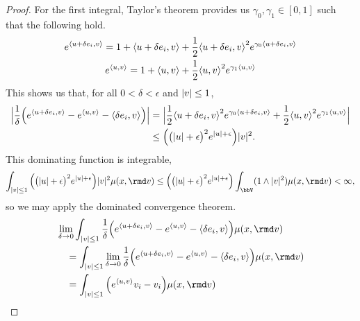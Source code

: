 \begin{proof}
  For the first integral, Taylor's theorem provides us $\gamma_0, \gamma_1 \in [0,1]$ such that the following hold.
  \begin{gather*}
    e^{\langle u+\delta e_i , v \rangle} = 1 + {\langle u+\delta e_i , v \rangle} + \frac12 {\langle u+\delta e_i , v \rangle}^2 e^{\gamma_0{\langle u+\delta e_i , v \rangle}} \\
    e^{\langle u , v \rangle} = 1 + {\langle u , v \rangle} + \frac12 {\langle u , v \rangle}^2 e^{\gamma_1{\langle u , v \rangle}}
  \end{gather*}
  This shows us that, for all $0 < \delta < \epsilon$ and $|v| \leq 1$,
  \begin{align*}
    \Big| \frac1\delta \Big( e^{\langle u+\delta e_i , v \rangle} - e^{\langle u , v \rangle} - {\langle \delta e_i , v \rangle} \Big) \Big|
    &= \Big| \frac{1}{2} {\langle u+\delta e_i , v \rangle}^2 e^{\gamma_0{\langle u+\delta e_i , v \rangle}} + \frac12{\langle u , v \rangle}^2 e^{\gamma_1{\langle u , v \rangle}} \Big| \\
    &\leq \Big(\big(|u| + \epsilon\big)^2 e^{|u|+\epsilon} \Big) |v|^2.
  \end{align*}
  This dominating function is integrable,
  \begin{equation*}
    \int_{|\markVar|\leq 1} \Big( \big(|\momentVar|+\epsilon\big)^2 e^{|\momentVar|+\epsilon} \Big) |\markVar|^2 \affJump(\stateVar,\rmd\markVar)
    \leq  \Big( \big(|\momentVar|+\epsilon\big)^2 e^{|\momentVar|+\epsilon} \Big) \int_\vecSpace (1 \wedge |\markVar|^2) \affJump(\stateVar,\rmd\markVar) < \infty,
  \end{equation*}
  so we may apply the dominated convergence theorem.
  \begin{align}
    &\lim_{\delta \rightarrow 0} \int_{|\markVar|\leq 1} \frac1\delta \Big( e^\prj{\momentVar+\delta \basisVec_i}{\markVar} - e^\prj{\momentVar}{\markVar} - \prj{\delta \basisVec_i}{\markVar} \Big) \affJump(\stateVar,\rmd\markVar) \notag \\
    &\quad= \int_{|\markVar|\leq 1} \lim_{\delta\rightarrow0} \frac{1}{\delta} \Big( e^\prj{\momentVar+\delta \basisVec_i}{\markVar} - e^\prj{\momentVar}{\markVar} - \prj{\delta \basisVec_i}{\markVar} \Big) \affJump(\stateVar,\rmd\markVar) \notag \\
    \label{eq:dct1}
    &\quad= \int_{|\markVar|\leq1} \Big( e^\prj{\momentVar}{\markVar} \markVar_i - \markVar_i \Big) \affJump(\stateVar,\rmd\markVar)
  \end{align}


\end{proof}
